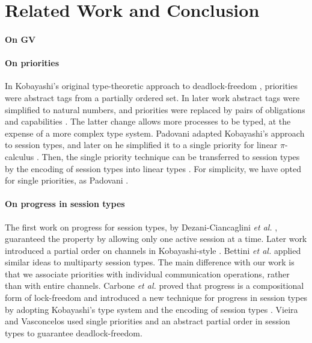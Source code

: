 \documentclass[main.tex]{subfiles}
\begin{document}
\section{Related Work and Conclusion}

\paragraph{On GV}

\paragraph{On priorities}
In Kobayashi's original type-theoretic approach to deadlock-freedom \cite{K98}, priorities were abstract tags from a partially ordered set. In later work abstract tags were simplified to natural numbers, and priorities were replaced by pairs of obligations and capabilities \cite{K02,K06}. The latter change allows more processes to be typed, at the expense of a more complex type system.
Padovani \cite{P13} adapted Kobayashi's approach to session types, and later on he simplified it to a single priority for linear $\pi$-calculus \cite{P14}. Then, the single priority technique can be transferred to session types by the encoding of session types into linear types \cite{Koba07,DGS12,D14,Dardha16}.
For simplicity, we have opted for single priorities, as Padovani \cite{P14}.

\paragraph{On progress in session types}
The first work on progress for session types, by Dezani-Ciancaglini \emph{et al.} \cite{DMYD06}, guaranteed the property by allowing only one active session at a time. Later work \cite{DLY07} introduced a partial order on channels in Kobayashi-style \cite{K98}.
Bettini \emph{et al.} \cite{BCDDDY08} applied similar ideas to multiparty session types. The main difference with our work is that we associate priorities with individual communication operations, rather than with entire channels. Carbone \emph{et al.} \cite{CDM14} proved that progress is a compositional form of lock-freedom and introduced a new technique for progress in session types by adopting Kobayashi's type system and the encoding of session types \cite{DGS12}.  Vieira and Vasconcelos \cite{VieiraV13} used single priorities and an abstract partial order in session types to guarantee deadlock-freedom.
\end{document}
